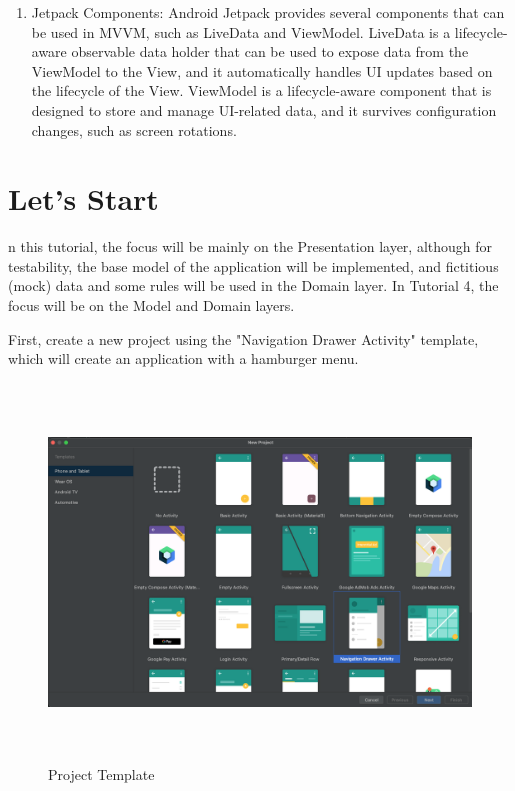 \documentclass[a4paper, 12pt]{article}
\begin{document}
\begin{enumerate}
    \item Jetpack Components: Android Jetpack provides several components that can be used in MVVM, such as LiveData and ViewModel. 
    LiveData is a lifecycle-aware observable data holder that can be used to expose data from the ViewModel to the View, and it automatically handles UI updates based on the lifecycle of the View. 
    ViewModel is a lifecycle-aware component that is designed to store and manage UI-related data, and it survives configuration changes, such as screen rotations.
    
\end{enumerate}




\section{Let's Start}

n this tutorial, the focus will be mainly on the Presentation layer, although for testability, the base model of the application will be implemented, and fictitious (mock) data and some rules will be used in the Domain layer. In Tutorial 4, the focus will be on the Model and Domain layers.

First, create a new project using the "Navigation Drawer Activity" template, which will create an application with a hamburger menu.

\begin{figure}
	\centering
	\includegraphics[height=10cm]{imgs/project/project_template.png}
	\caption{Project Template}
	\label{fig:pj_template}
\end{figure}
\end{document}
